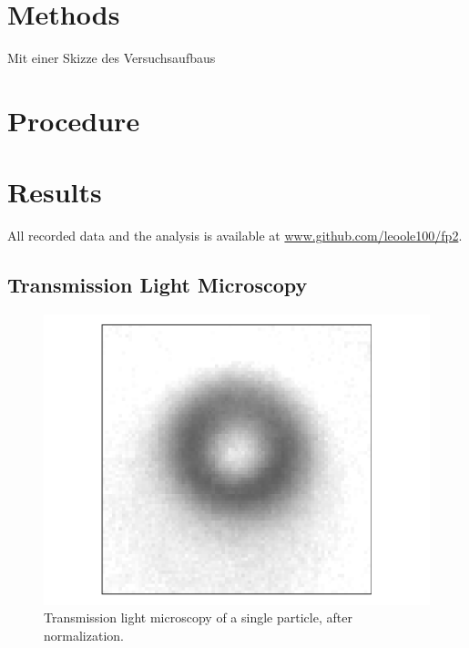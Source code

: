 \documentclass[
    parskip=half, 
    twoside=false,
    twocolumn=true,
    fontsize=11pt,
]{scrarticle}
\begin{document}
\section{Methods}
Mit einer Skizze des Versuchsaufbaus

\section{Procedure}

\pagebreak
\section{Results}

All recorded data and the analysis is available at \url{www.github.com/leoole100/fp2}.

\subsection{Transmission Light Microscopy}
\begin{figure}[h]
    \centering
    \includegraphics{figures/01_01_1_particle.pdf}
    \caption{Transmission light microscopy of a single particle, after normalization.}
\end{figure}
\end{document}
